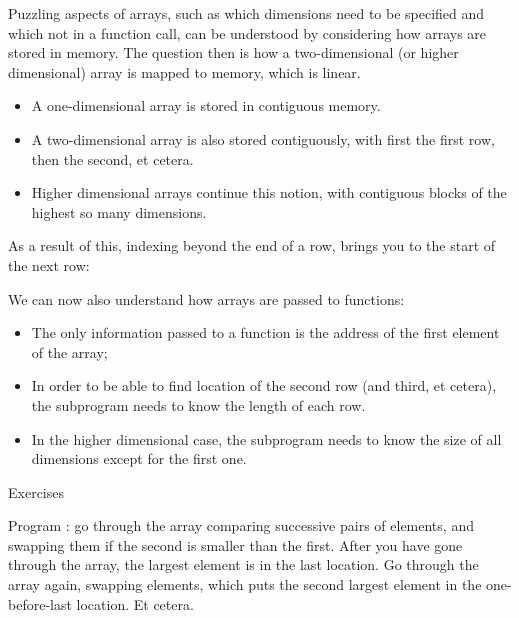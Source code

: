 Puzzling aspects of arrays, such as which dimensions need to be
specified and which not in a function call, can be understood by
considering how arrays are stored in memory.
The question then is how a two-dimensional (or higher dimensional)
array is mapped to memory, which is linear.
\begin{itemize}
\item A one-dimensional array is stored in contiguous memory.
\item A two-dimensional array is also stored contiguously, with first
  the first row, then the second, et cetera.
\item Higher dimensional arrays continue this notion, with contiguous
  blocks of the highest so many dimensions.
\end{itemize}

As a result of this, indexing beyond the end of a row, brings you to the
start of the next row:
%

We can now also understand how arrays are passed to functions:
\begin{itemize}
\item The only information passed to a function is the address of the
  first element of the array;
\item In order to be able to find location of the second row (and
  third, et cetera), the subprogram needs to know the length of each
  row.
\item In the higher dimensional case, the subprogram needs to know the
  size of all dimensions except for the first one.
\end{itemize}

 {Exercises}

\begin{exercise}
  Program : go through the array comparing
  successive pairs of elements, and swapping them if the second is
  smaller than the first. After you have gone through the array, the
  largest element is in the last location. Go through the array again,
  swapping elements, which puts the second largest element in the
  one-before-last location. Et cetera.
\end{exercise}

